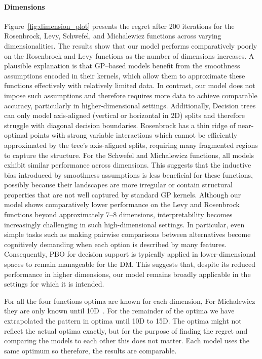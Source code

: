 \documentclass{article}
\begin{document}
\paragraph{Dimensions}
Figure~\ref{fig:dimension_plot} presents the regret after 200 iterations for the Rosenbrock, Levy, Schwefel, and Michalewicz functions across varying dimensionalities. The results show that our model performs comparatively poorly on the Rosenbrock and Levy functions as the number of dimensions increases. A plausible explanation is that GP–based models benefit from the smoothness assumptions encoded in their kernels, which allow them to approximate these functions effectively with relatively limited data. In contrast, our model does not impose such assumptions and therefore requires more data to achieve comparable accuracy, particularly in higher-dimensional settings. Additionally, Decision trees can only model axis-aligned (vertical or horizontal in 2D) splits and therefore struggle with diagonal decision boundaries.  Rosenbrock has a thin ridge of near-optimal points with strong variable interactions which cannot be efficiently approximated by the tree’s axis-aligned splits, requiring many fragmented regions to capture the structure. For the Schwefel and Michalewicz functions, all models exhibit similar performance across dimensions. This suggests that the inductive bias introduced by smoothness assumptions is less beneficial for these functions, possibly because their landscapes are more irregular or contain structural properties that are not well captured by standard GP kernels. Although our model shows comparatively lower performance on the Levy and Rosenbrock functions beyond approximately 7–8 dimensions, interpretability becomes increasingly challenging in such high-dimensional settings. In particular, even simple tasks such as making pairwise comparisons between alternatives become cognitively demanding when each option is described by many features. Consequently, PBO for decision support is typically applied in lower-dimensional spaces to remain manageable for the DM. This suggests that, despite its reduced performance in higher dimensions, our model remains broadly applicable in the settings for which it is intended.

For all the four functions optima are known for each dimension, For Michalewicz they are only known until 10D~\cite{vanaret2020certified}. For the remainder of the optima we have extrapolated the pattern in optima until 10D to 15D. The optima might not reflect the actual optima exactly, but for the purpose of finding the regret and comparing the models to each other this does not matter. Each model uses the same optimum so therefore, the results are comparable.
\end{document}

